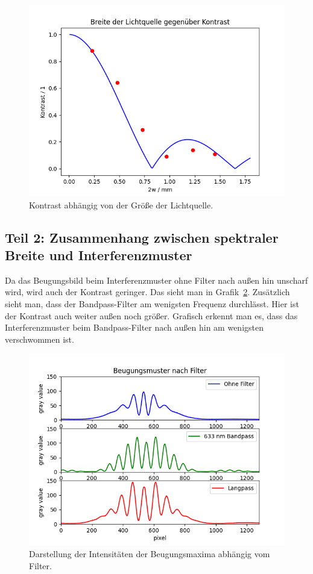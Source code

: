 \documentclass{article}
\begin{document}
\begin{figure}[H]
\centering
\caption{Kontrast abhängig von der Größe der Lichtquelle.}
\label{fig:curve_task1}
\includegraphics[width=12cm]{curve_task1.png}
\end{figure}




\subsection{Teil 2: Zusammenhang zwischen spektraler Breite und Interferenzmuster}

Da das Beugungsbild beim Interferenzmuster ohne Filter nach außen hin unscharf wird, wird auch der Kontrast geringer. Das sieht man in Grafik~\ref{fig:filter_kurven}. Zusätzlich sieht man, dass der Bandpass-Filter am wenigsten Frequenz durchlässt. Hier ist der Kontrast auch weiter außen noch größer. Grafisch erkennt man es, dass das Interferenzmuster beim Bandpass-Filter nach außen hin am wenigsten verschwommen ist.

\begin{figure}[H]
\centering
\caption{Darstellung der Intensitäten der Beugungsmaxima abhängig vom Filter.}
\label{fig:filter_kurven}
\includegraphics[width=12cm]{filter.png}
\end{figure}
\end{document}
